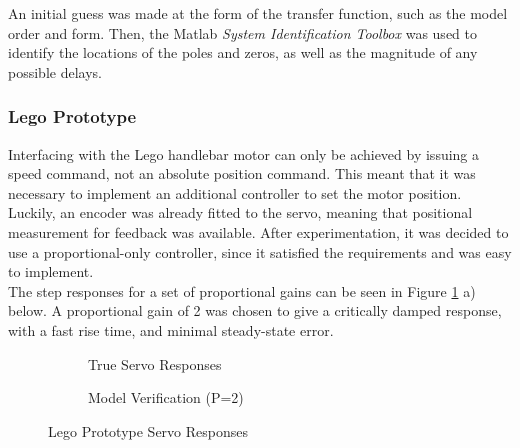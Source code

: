 An initial guess was made at the form of the transfer function, such as the model order and form. Then, the Matlab \textit{System Identification Toolbox} was used to identify the locations of the poles and zeros, as well as the magnitude of any possible delays.

\subsubsection{Lego Prototype}
Interfacing with the Lego handlebar motor can only be achieved by issuing a speed command, not an absolute position command. This meant that it was necessary to implement an additional controller to set the motor position. Luckily, an encoder was already fitted to the servo, meaning that positional measurement for feedback was available. After experimentation, it was decided to use a proportional-only controller, since it satisfied the requirements and was easy to implement. \\

The step responses for a set of proportional gains can be seen in Figure \ref{fig:ServoModel} a) below. A proportional gain of 2 was chosen to give a critically damped response, with a fast rise time, and minimal steady-state error. \\

\begin{figure}[H]
	\begin{subfigure}[t]{0.5\textwidth}
	\caption{True Servo Responses}
	\end{subfigure}
	\begin{subfigure}[t]{0.5\textwidth}
	\caption{Model Verification (P=2)}
	\end{subfigure}
	\caption{Lego Prototype Servo Responses}
	\label{fig:ServoModel}
\end{figure}


